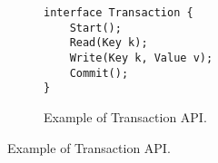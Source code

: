 %
%
\begin{figure}[t]

\hrulefill

\begin{subfigure}{0.38\textwidth}
\begin{verbatim}
interface Transaction {
    Start(); 
    Read(Key k);
    Write(Key k, Value v); 
    Commit();    
}
\end{verbatim}
\caption{Example of Transaction API.}
\label{fig:api}
\end{subfigure}

\hrulefill

\end{figure}
%
%
